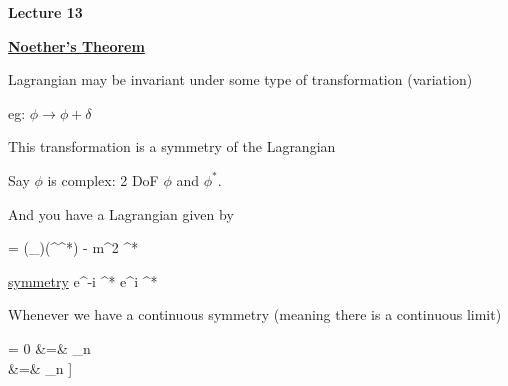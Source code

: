 
\usepackage{braket}
\usepackage{bbm}
\usepackage{relsize}
\usepackage{tcolorbox}



\usepackage{cancel}

\usepackage{fancyhdr}

\fancyhf{}


\thispagestyle{fancy}

\begin{center}
{\huge \textbf{Lecture 13}}
\end{center}

{\fontsize{14}{16}\selectfont

\textbf{\underline{Noether's Theorem}} 

Lagrangian may be invariant under some type of transformation (variation) 

eg: $\phi \rightarrow \phi + \delta$

This transformation is a symmetry of the Lagrangian

Say $\phi$ is complex:  2 DoF  $\phi$ and $\phi^*$.

And you have a Lagrangian given by


\be
{} = (\partial_\mu \phi)(\partial^\mu \phi^*) - m^2 \phi \phi^*
\ee

\underline{symmetry}
\be
\phi \rightarrow e^{-i\alpha} \phi \hspace{1in} \phi^* \rightarrow e^{i\alpha} \phi^*
\ee


Whenever we have a continuous symmetry (meaning there is a continuous limit)

\bea
{} = 0 &=& \sum_n   \\ 
&=& \sum_n \left[ \underbrace{\left[ \frac{\partial \mathcal{L}}{\partial \phi_n} - \partial_\mu \frac{\partial \mathcal{L}}{\partial (\partial_\mu \phi_n)} \right]}_{=0\ \textrm{Euler Lagrange}} \frac{\delta \phi_n}{\delta \alpha}  +  \partial_\mu \left[ \frac{\partial \mathcal{L}}{\partial (\partial_\mu \phi_n)} \frac{\delta \phi_n}{\delta \alpha} \right] \right]
\eea

}
